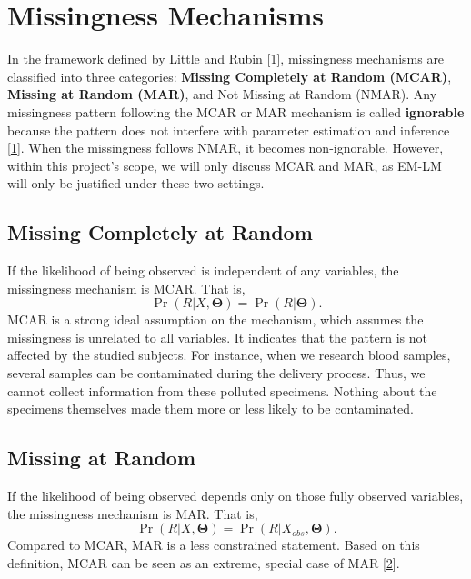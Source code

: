 \documentclass[
  twocolumn]{article}
\begin{document}
\hypertarget{missingness-mechanisms}{%
\section{Missingness Mechanisms}\label{missingness-mechanisms}}

In the framework defined by Little and Rubin
{[}\protect\hyperlink{ref-little2019statistical}{1}{]}, missingness
mechanisms are classified into three categories: \textbf{Missing
Completely at Random (MCAR)}, \textbf{Missing at Random (MAR)}, and Not
Missing at Random (NMAR). Any missingness pattern following the MCAR or
MAR mechanism is called \textbf{ignorable} because the pattern does not
interfere with parameter estimation and inference
{[}\protect\hyperlink{ref-little2019statistical}{1}{]}. When the
missingness follows NMAR, it becomes non-ignorable. However, within this
project's scope, we will only discuss MCAR and MAR, as EM-LM will only
be justified under these two settings.

\hypertarget{missing-completely-at-random}{%
\subsection{Missing Completely at
Random}\label{missing-completely-at-random}}

If the likelihood of being observed is independent of any variables, the
missingness mechanism is MCAR. That is, \[
\Pr(R|X,  \boldsymbol\Theta) = \Pr(R| \boldsymbol\Theta).
\] MCAR is a strong ideal assumption on the mechanism, which assumes the
missingness is unrelated to all variables. It indicates that the pattern
is not affected by the studied subjects. For instance, when we research
blood samples, several samples can be contaminated during the delivery
process. Thus, we cannot collect information from these polluted
specimens. Nothing about the specimens themselves made them more or less
likely to be contaminated.

\hypertarget{missing-at-random}{%
\subsection{Missing at Random}\label{missing-at-random}}

If the likelihood of being observed depends only on those fully observed
variables, the missingness mechanism is MAR. That is, \[
\Pr(R|X, \boldsymbol\Theta) = \Pr(R|X_{obs}, \boldsymbol\Theta).
\] Compared to MCAR, MAR is a less constrained statement. Based on this
definition, MCAR can be seen as an extreme, special case of MAR
{[}\protect\hyperlink{ref-schafer2002missing}{2}{]}.
\end{document}
